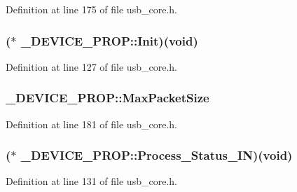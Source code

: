 Definition at line 175 of file usb\-\_\-core.\-h.

\hypertarget{struct___d_e_v_i_c_e___p_r_o_p_a04c59669debabd18caa5a474d4d702f8}{
\subsubsection[{Init}]{($\ast$ \-\_\-\-D\-E\-V\-I\-C\-E\-\_\-\-P\-R\-O\-P\-::\-Init)({\bf void})}}\label{struct___d_e_v_i_c_e___p_r_o_p_a04c59669debabd18caa5a474d4d702f8}


Definition at line 127 of file usb\-\_\-core.\-h.

\hypertarget{struct___d_e_v_i_c_e___p_r_o_p_aa110e889cdf94f81f92342f84a235797}{
\subsubsection[{Max\-Packet\-Size}]{ \-\_\-\-D\-E\-V\-I\-C\-E\-\_\-\-P\-R\-O\-P\-::\-Max\-Packet\-Size}}\label{struct___d_e_v_i_c_e___p_r_o_p_aa110e889cdf94f81f92342f84a235797}


Definition at line 181 of file usb\-\_\-core.\-h.

\hypertarget{struct___d_e_v_i_c_e___p_r_o_p_ad5b7f1d4c7f5850dbb6122e11d36f03d}{
\subsubsection[{Process\-\_\-\-Status\-\_\-\-I\-N}]{($\ast$ \-\_\-\-D\-E\-V\-I\-C\-E\-\_\-\-P\-R\-O\-P\-::\-Process\-\_\-\-Status\-\_\-\-I\-N)({\bf void})}}\label{struct___d_e_v_i_c_e___p_r_o_p_ad5b7f1d4c7f5850dbb6122e11d36f03d}


Definition at line 131 of file usb\-\_\-core.\-h.

